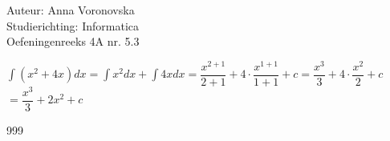 \documentclass[a4paper]{article}
\begin{document}
  
\noindent \large Auteur: Anna Voronovska \\
\noindent \large Studierichting: Informatica\\
\noindent \large Oefeningenreeks 4A nr. 5.3\\

\medskip

\normalsize

$\displaystyle\int (x^2 + 4x)dx = \displaystyle\int x^2dx + \displaystyle\int 4xdx = \dfrac{x^{2+1}}{2+1} + 4 \cdot \dfrac{x^{1+1}}{1+1} + c = \dfrac{x^3}{3} + 4 \cdot \dfrac{x^2}{2} + c$\\

$= \dfrac{x^3}{3} + 2x^2 + c$

\begin{thebibliography}{999}
\end{thebibliography}
\end{document}
